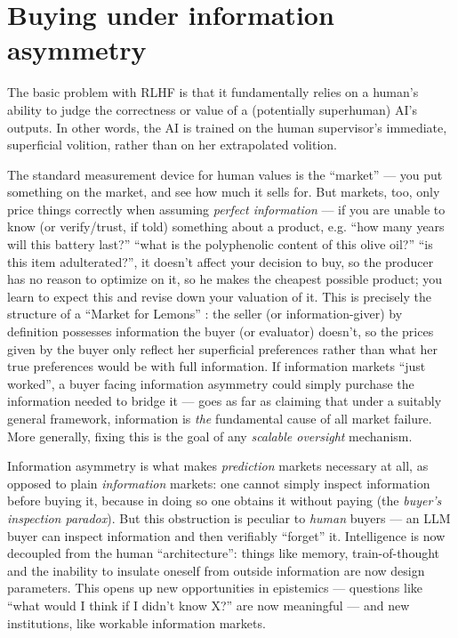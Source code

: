 \section*{Buying under information asymmetry}

The basic problem with RLHF is that it fundamentally relies on a human's ability to judge the correctness or value of a (potentially superhuman) AI's outputs. In other words, the AI is trained on the human supervisor's immediate, superficial volition, rather than on her extrapolated volition.

The standard measurement device for human values is the ``market'' --- you put something on the market, and see how much it sells for. But markets, too, only price things correctly when assuming \emph{perfect information} --- if you are unable to know (or verify/trust, if told) something about a product, e.g. ``how many years will this battery last?'' ``what is the polyphenolic content of this olive oil?'' ``is this item adulterated?'', it doesn't affect your decision to buy, so the producer has no reason to optimize on it, so he makes the cheapest possible product; you learn to expect this and revise down your valuation of it. This is precisely the structure of a ``Market for Lemons'' \citep{lemons}: the seller (or information-giver) by definition possesses information the buyer (or evaluator) doesn't, so the prices given by the buyer only reflect her superficial preferences rather than what her true preferences would be with full information. If information markets ``just worked'', a buyer facing information asymmetry could simply purchase the information needed to bridge it --- \citet{barzelTransactionCostsAre1985} goes as far as claiming that under a suitably general framework, information is \emph{the} fundamental cause of all market failure. More generally, fixing this is the goal of any \emph{scalable oversight} mechanism.

Information asymmetry is what makes \emph{prediction} markets necessary at all, as opposed to plain \emph{information} markets: one cannot simply inspect information before buying it, because in doing so one obtains it without paying (the \emph{buyer's inspection paradox}). But this obstruction is peculiar to \emph{human} buyers --- an LLM buyer can inspect information and then verifiably ``forget'' it. Intelligence is now decoupled from the human ``architecture'': things like memory, train-of-thought and the inability to insulate oneself from outside information are now design parameters. This opens up new opportunities in epistemics --- questions like ``what would I think if I didn't know X?'' are now meaningful --- and new institutions, like workable information markets.

